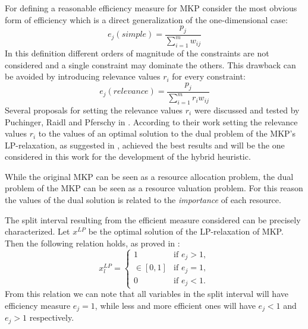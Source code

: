 \label{subsec:dual}
For defining a reasonable efficiency measure for MKP consider the most obvious
form of efficiency which is a direct generalization of the one-dimensional case:
\begin{equation}
	e_j(simple) = \frac{p_j}{\sum_{i=1}^{m} w_{ij}}
\end{equation}
In this definition different orders of magnitude of the constraints are not
considered and a single constraint may dominate the others.
This drawback can be avoided by introducing relevance values $r_i$ for every
constraint:
\begin{equation}
	e_j(relevance) = \frac{p_j}{\sum_{i=1}^{m} r_i w_{ij}}
\end{equation}
Several proposals for setting the relevance values $r_i$ were discussed and
tested by Puchinger, Raidl and Pferschy in \cite{puchinger2006core}.
According to their work setting the relevance values $r_i$ to the values of an
optimal solution to the dual problem of the MKP's LP-relaxation, as suggested
in \cite{Chu-Beasley-1998}, achieved the best results and will be the one
considered in this work for the development of the hybrid heuristic.

While the original MKP can be seen as a resource allocation problem,
the dual problem of the MKP can be seen as a resource valuation problem.
For this reason the values of the dual solution is related to the
\emph{importance} of each resource.

The split interval resulting from the efficient measure considered can be
precisely characterized.
Let $x^{LP}$ be the optimal solution of the LP-relaxation of MKP.
Then the following relation holds, as proved in \cite{puchinger2006core}:
\begin{displaymath}
 x_l^{LP} =
  \begin{cases}
    1         & \mbox{if } e_j > 1, \\
    \in [0,1] & \mbox{if } e_j = 1, \\
    0         & \mbox{if } e_j < 1.
  \end{cases}
\end{displaymath}
From this relation we can note that all variables in the split interval will
have efficiency measure $e_j = 1$, while less and more efficient ones will have
$e_j < 1$ and $e_j > 1$ respectively.

